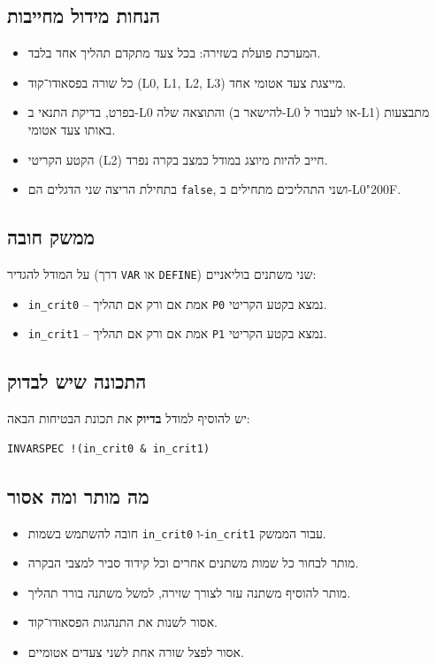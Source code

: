 \documentclass[11pt,a4paper]{article}
\newcommand{\RLM}{\char"200F}
\newenvironment{englishlisting}
  {\begin{english}\begin{flushleft}}
  {\end{flushleft}\end{english}}
\begin{document}
\subsection*{הנחות מידול מחייבות}
\begin{itemize}
  \item המערכת פועלת בשזירה: בכל צעד מתקדם תהליך אחד בלבד.
  \item כל שורה בפסאודו־קוד \textenglish{(L0, L1, L2, L3)} מייצגת צעד אטומי אחד.
  \item בפרט, בדיקת התנאי ב-\textenglish{L0} והתוצאה שלה (להישאר ב-\textenglish{L0} או לעבור ל-\textenglish{L1}) מתבצעות באותו צעד אטומי.
  \item הקטע הקריטי (L2) חייב להיות מיוצג במודל כמצב בקרה נפרד.
  \item בתחילת הריצה שני הדגלים הם \texttt{false}, ושני התהליכים מתחילים ב-\textenglish{L0}\RLM.
\end{itemize}

\subsection*{ממשק חובה}
על המודל להגדיר (דרך \texttt{VAR} או \texttt{DEFINE}) שני משתנים בוליאניים:
\begin{itemize}
  \item \texttt{in\_crit0} -- אמת אם ורק אם תהליך \texttt{P0} נמצא בקטע הקריטי.
  \item \texttt{in\_crit1} -- אמת אם ורק אם תהליך \texttt{P1} נמצא בקטע הקריטי.
\end{itemize}

\subsection*{התכונה שיש לבדוק}
יש להוסיף למודל \textbf{בדיוק} את תכונת הבטיחות הבאה:
\begin{englishlisting}
\begin{lstlisting}
INVARSPEC !(in_crit0 & in_crit1)
\end{lstlisting}
\end{englishlisting}

\subsection*{מה מותר ומה אסור}
\begin{itemize}
  \item חובה להשתמש בשמות \texttt{in\_crit0} ו-\texttt{in\_crit1} עבור הממשק.
  \item מותר לבחור כל שמות משתנים אחרים וכל קידוד סביר למצבי הבקרה.
  \item מותר להוסיף משתנה עזר לצורך שזירה, למשל משתנה בורר תהליך.
  \item אסור לשנות את התנהגות הפסאודו־קוד.
  \item אסור לפצל שורה אחת לשני צעדים אטומיים.
\end{itemize}
\end{document}
